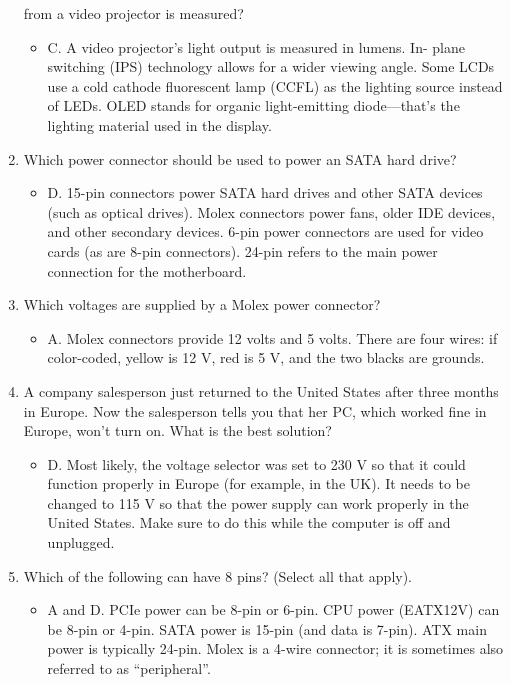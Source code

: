 \documentclass{article}
\begin{document}
\begin{enumerate}
from a video projector is measured?
    \begin{itemize}
        \item C. A video projector’s light output is measured in lumens. In-
plane switching (IPS) technology allows for a wider viewing
angle. Some LCDs use a cold cathode fluorescent lamp
(CCFL) as the lighting source instead of LEDs. OLED stands
for organic light-emitting diode—that’s the lighting material
used in the display.
    \end{itemize}
    \item Which power connector should be used to power
an SATA hard drive?
    \begin{itemize}
        \item D. 15-pin connectors power SATA hard drives and
other SATA devices (such as optical drives). Molex
connectors power fans, older IDE devices, and
other secondary devices. 6-pin power connectors
are used for video cards (as are 8-pin connectors).
24-pin refers to the main power connection for
the motherboard.
    \end{itemize}
    \item Which voltages are supplied by a Molex power
connector?
    \begin{itemize}
        \item A. Molex connectors provide 12 volts and 5 volts.
There are four wires: if color-coded, yellow is 12 V,
red is 5 V, and the two blacks are grounds.
    \end{itemize}
    \item A company salesperson just returned to the
United States after three months in Europe. Now
the salesperson tells you that her PC, which
worked fine in Europe, won’t turn on. What is the
best solution?
    \begin{itemize}
        \item D. Most likely, the voltage selector was set to 230
V so that it could function properly in Europe (for
example, in the UK). It needs to be changed to 115
V so that the power supply can work properly in
the United States. Make sure to do this while the
computer is off and unplugged.
    \end{itemize}
    \item Which of the following can have 8 pins? (Select all
that apply).
    \begin{itemize}
        \item A and D. PCIe power can be 8-pin or 6-pin. CPU
power (EATX12V) can be 8-pin or 4-pin. SATA
power is 15-pin (and data is 7-pin). ATX main
power is typically 24-pin. Molex is a 4-wire
connector; it is sometimes also referred to as
“peripheral”.
    \end{itemize}
\end{enumerate}
\end{document}

